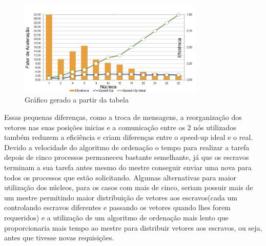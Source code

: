 \documentclass[11pt]{IEEEtran}
\begin{document}
	\begin{table}[H]
		\centering
		\caption{Resultados obtidos}
		\label{result_table}
	\end{table}

	\begin{figure}[H]
		\centering
		\includegraphics[width=88mm]{doc/graph.png}
		\caption{Gráfico gerado a partir da tabela}
		\label{fig_graph}
	\end{figure}

	Essas pequenas diferenças, como a troca de mensagens, a reorganização dos
	vetores nas suas posições inicias e a comunicação entre os 2 nós utilizados
	também reduzem a eficiência e criam diferenças entre o speed-up ideal e o
	real. Devido a velocidade do algoritmo de ordenação o tempo para realizar a
	tarefa depois de cinco processos permaneceu bastante semelhante, já que os
	escravos terminam a sua tarefa antes mesmo do mestre conseguir enviar uma
	nova para todos os processos que estão solicitando.  Algumas alternativas
	para maior utilização dos núcleos, para os casos com mais de cinco, seriam
	possuir mais de um mestre permitindo maior distribuição de vetores aos
	escravos(cada um controlando escravos diferentes e passando os vetores
	quando lhes forem requeridos) e a utilização de um algoritmo de ordenação
	mais lento que proporcionaria mais tempo ao mestre para distribuir vetores
	aos escravos, ou seja, antes que tivesse novas requisições.
\end{document}
